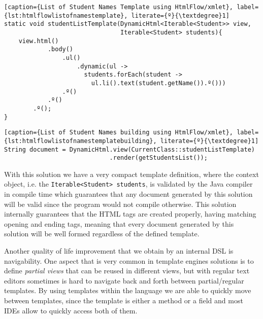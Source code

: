\bigskip


\begin{minipage}{\linewidth}
\begin{lstlisting}[caption={List of Student Names Template using HtmlFlow/xmlet}, label={lst:htmlflowlistofnamestemplate}, literate={º}{\textdegree}1]
static void studentListTemplate(DynamicHtml<Iterable<Student>> view,                                
                                Iterable<Student> students){
    view.html()
            .body()
                .ul()
                    .dynamic(ul -> 
                      students.forEach(student ->                   
                        ul.li().text(student.getName()).º()))
                .º()
            .º()
        .º();
}
\end{lstlisting}
\end{minipage} 

\bigskip


\begin{minipage}{\linewidth}
\begin{lstlisting}[caption={List of Student Names building using HtmlFlow/xmlet}, label={lst:htmlflowlistofnamestemplatebuilding}, literate={º}{\textdegree}1]
String document = DynamicHtml.view(CurrentClass::studentListTemplate)
                             .render(getStudentsList());
\end{lstlisting}
\end{minipage} 

\noindent
With this solution we have a very compact template definition, where the context object, i.e. the \texttt{Iterable<Student> students}, is validated by the Java compiler in compile time which guarantees that any document generated by this solution will be valid since the program would not compile otherwise. This solution internally guarantees that the \ac{HTML} tags are created properly, having matching opening and ending tags, meaning that every document generated by this solution will be well formed regardless of the defined template. 

\noindent
Another quality of life improvement that we obtain by an internal \ac{DSL} is navigability. One aspect that is very common in template engines solutions is to define \textit{partial views} that can be reused in different views, but with regular text editors sometimes is hard to navigate back and forth between partial/regular templates. By using templates within the language we are able to quickly move between templates, since the template is either a method or a field and most \ac{IDE}s allow to quickly access both of them.

